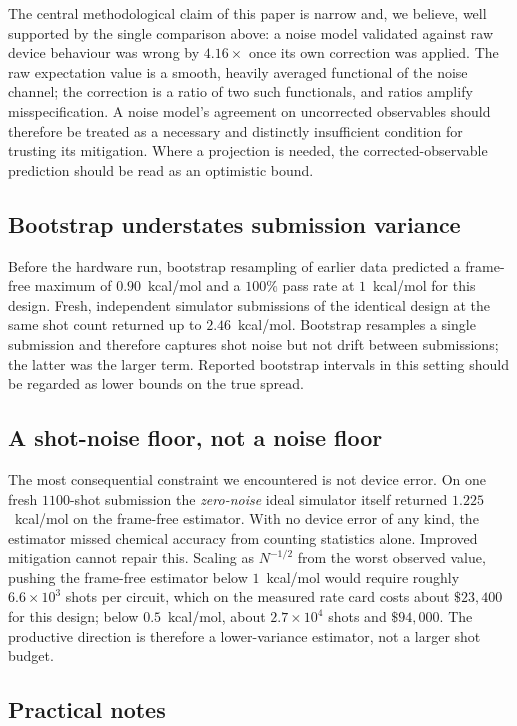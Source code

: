 \documentclass[aps,prx,twocolumn,superscriptaddress,nofootinbib,floatfix]{revtex4-2}
\begin{document}
The central methodological claim of this paper is narrow and, we believe,
well supported by the single comparison above: a noise model validated
against raw device behaviour was wrong by $4.16\times$ once its own
correction was applied. The raw expectation value is a smooth, heavily
averaged functional of the noise channel; the correction is a ratio of two
such functionals, and ratios amplify misspecification. A noise model's
agreement on uncorrected observables should therefore be treated as a
necessary and distinctly insufficient condition for trusting its
mitigation. Where a projection is needed, the corrected-observable
prediction should be read as an optimistic bound.

\subsection{Bootstrap understates submission variance}

Before the hardware run, bootstrap resampling of earlier data predicted a
frame-free maximum of $0.90$~kcal/mol and a $100\%$ pass rate at
$1$~kcal/mol for this design. Fresh, independent simulator submissions of
the identical design at the same shot count returned up to
$2.46$~kcal/mol. Bootstrap resamples a single submission and therefore
captures shot noise but not drift between submissions; the latter was the
larger term. Reported bootstrap intervals in this setting should be
regarded as lower bounds on the true spread.

\subsection{A shot-noise floor, not a noise floor}

The most consequential constraint we encountered is not device error. On
one fresh $1100$-shot submission the \emph{zero-noise} ideal simulator
itself returned $1.225$~kcal/mol on the frame-free estimator. With no
device error of any kind, the estimator missed chemical accuracy from
counting statistics alone. Improved mitigation cannot repair this.
Scaling as $N^{-1/2}$ from the worst observed value, pushing the
frame-free estimator below $1$~kcal/mol would require roughly
$6.6\times10^3$ shots per circuit, which on the measured rate card costs
about $\$23{,}400$ for this design; below $0.5$~kcal/mol, about
$2.7\times10^4$ shots and $\$94{,}000$. The productive direction is
therefore a lower-variance estimator, not a larger shot budget.

\subsection{Practical notes}
\end{document}
